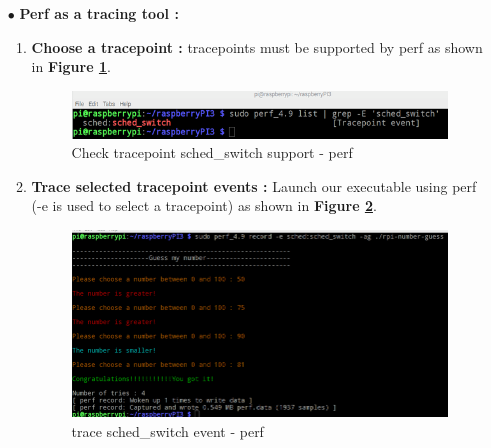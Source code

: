 \begin{itemize}
\begin{itemize}
    				
	\end{itemize}

	
	
	


	
	
	
	\item[$\bullet$] \textbf{Perf as a tracing tool : }
		\begin{enumerate}
			\item \textbf{Choose a tracepoint : } tracepoints must be supported by perf as shown in \textbf{Figure \ref{Check tracepoint support - perf}}.
					\begin{figure}[H]
						\centering
        				\includegraphics[scale=0.55]{img/solution/check-sched-switch-support-perf.png}
        				\caption{Check tracepoint sched\_switch support - perf}
        				\label{Check tracepoint support - perf}
    				\end{figure}		
			
			\item \textbf{Trace selected tracepoint events : } Launch our executable using perf (-e is used to select a tracepoint) as shown in \textbf{Figure \ref{trace sched-switch event - perf}}.
					\begin{figure}[H]
						\centering
        				\includegraphics[scale=0.4]{img/solution/trace-sched-switch-perf.png}
        				\caption{trace sched\_switch event - perf}
        				\label{trace sched-switch event - perf}
    				\end{figure}			
			

\end{enumerate}
\end{itemize}
